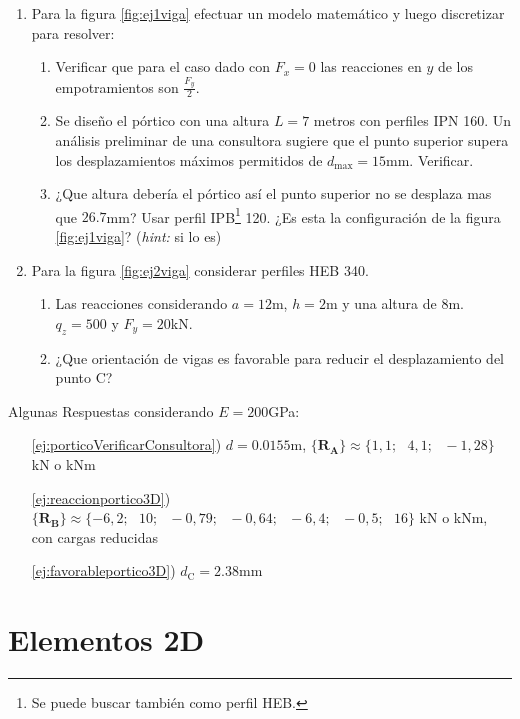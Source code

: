 \documentclass[11pt, a4paper,titlepage]{article}
\newcommand{\ms}{\ \ \ } %
\newcommand{\Cme}[1]{\boldsymbol{\{ }\mathbf{#1} \boldsymbol{\}} }
\begin{document}
\begin{enumerate}
	\item Para la figura \ref{fig:ej1viga} efectuar un modelo matemático y luego discretizar para resolver:
	\begin{enumerate}
		\item Verificar que para el caso dado con $F_x=0$ las reacciones en $y$ de los empotramientos son $\frac{F_y}{2}$.
		\item Se diseño el pórtico con una altura $L=7$ metros con perfiles IPN 160. Un análisis preliminar de una consultora sugiere que el punto superior supera los desplazamientos máximos permitidos de $d_{\max}=15$mm. Verificar.\label{ej:porticoVerificarConsultora}
		\item ¿Que altura debería el pórtico así el punto superior no se desplaza mas que $26.7$mm? Usar perfil IPB\footnote{Se puede buscar también como perfil HEB.} 120. ¿Es esta la configuración de la figura \ref{fig:ej1viga}? (\textit{hint:} si lo es)\label{ej:probvigaaltura}
	\end{enumerate}
	\item Para la figura \ref{fig:ej2viga} considerar perfiles HEB 340. 
	\begin{enumerate}
		\item Las reacciones considerando $a=12$m, $h=2$m  y una altura de $8$m. $q_z=500$ y $F_y=20$kN. \label{ej:reaccionportico3D}
		\item ¿Que orientación de vigas es favorable para reducir el desplazamiento del punto C?\label{ej:favorableportico3D} 
	\end{enumerate}
\end{enumerate}
Algunas Respuestas considerando $E=200$GPa:
\begin{itemize}
	\item[\ref{ej:porticoVerificarConsultora})]$d=0.0155$m, $\Cme{R_A}\approx\{1,1;\ms4,1;\ms-1,28\}$ kN o kNm
	
	\item[\ref{ej:reaccionportico3D})] $\Cme{R_B}\approx
	\{-6,2;\ms    10;\ms   -0,79;\ms   -0,64;\ms   -6,4;\ms   -0,5;\ms   16\}$ kN o kNm, con cargas reducidas
	
	\item[\ref{ej:favorableportico3D})] $d_{\mathrm{C}}=2.38$mm
	
\end{itemize}

\part{Elementos 2D}
\end{document}
